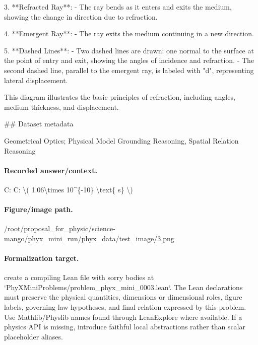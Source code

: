 3. **Refracted Ray**:
   - The ray bends as it enters and exits the medium, showing the change in direction due to refraction.

4. **Emergent Ray**:
   - The ray exits the medium continuing in a new direction.

5. **Dashed Lines**:
   - Two dashed lines are drawn: one normal to the surface at the point of entry and exit, showing the angles of incidence and refraction.
   - The second dashed line, parallel to the emergent ray, is labeled with "d", representing lateral displacement.

This diagram illustrates the basic principles of refraction, including angles, medium thickness, and displacement.

\#\# Dataset metadata

Geometrical Optics; Physical Model Grounding Reasoning, Spatial Relation Reasoning

\paragraph{Recorded answer/context.}
C: C: \textbackslash{}( 1.06\textbackslash{}times 10\textasciicircum{}\{-10\} \textbackslash{}text\{ s\} \textbackslash{})

\paragraph{Figure/image path.}
/root/proposal\_for\_physic/science-mango/phyx\_mini\_run/phyx\_data/test\_image/3.png

\paragraph{Formalization target.}
create a compiling Lean file with sorry bodies at `PhyXMiniProblems/problem\_phyx\_mini\_0003.lean`. The Lean declarations must preserve the physical quantities, dimensions or dimensional roles, figure labels, governing-law hypotheses, and final relation expressed by this problem.
Use Mathlib/Physlib names found through LeanExplore where available. If a physics API is missing, introduce faithful local abstractions rather than scalar placeholder aliases.

